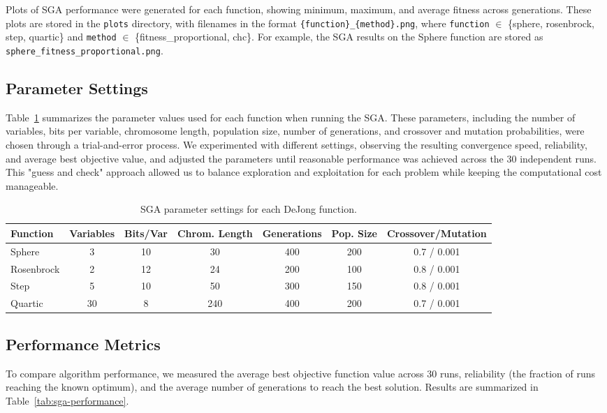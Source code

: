 \documentclass[11pt]{article}
\begin{document}
Plots of SGA performance were generated for each function, showing minimum, maximum, and average fitness across generations. These plots are stored in the \texttt{plots} directory, with filenames in the format \texttt{\{function\}\_\{method\}.png}, where \texttt{function} $\in$ \{sphere, rosenbrock, step, quartic\} and \texttt{method} $\in$ \{fitness\_proportional, chc\}. For example, the SGA results on the Sphere function are stored as \texttt{sphere\_fitness\_proportional.png}.  

\subsection{Parameter Settings}
Table~\ref{tab:sga-params} summarizes the parameter values used for each function when running the SGA. These parameters, including the number of variables, bits per variable, chromosome length, population size, number of generations, and crossover and mutation probabilities, were chosen through a trial-and-error process. We experimented with different settings, observing the resulting convergence speed, reliability, and average best objective value, and adjusted the parameters until reasonable performance was achieved across the 30 independent runs. This "guess and check" approach allowed us to balance exploration and exploitation for each problem while keeping the computational cost manageable.

\begin{table}[H]
\centering
\caption{SGA parameter settings for each DeJong function.}
\label{tab:sga-params}
\begin{tabular}{lcccccc}
\toprule
Function & Variables & Bits/Var & Chrom. Length & Generations & Pop. Size & Crossover/Mutation \\
\midrule
Sphere      & 3  & 10 & 30  & 400 & 200 & 0.7 / 0.001 \\
Rosenbrock  & 2  & 12 & 24  & 200 & 100 & 0.8 / 0.001 \\
Step        & 5  & 10 & 50  & 300 & 150 & 0.8 / 0.001 \\
Quartic     & 30 & 8  & 240 & 400 & 200 & 0.7 / 0.001 \\
\bottomrule
\end{tabular}
\end{table}


\subsection{Performance Metrics}
To compare algorithm performance, we measured the average best objective function value across 30 runs, reliability (the fraction of runs reaching the known optimum), and the average number of generations to reach the best solution. Results are summarized in Table~\ref{tab:sga-performance}.  
\end{document}
